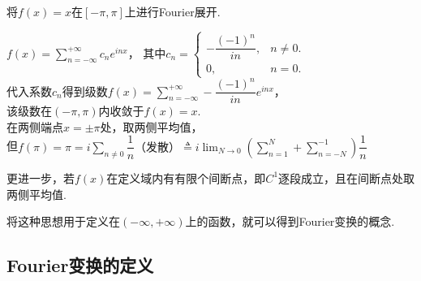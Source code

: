 \documentclass[openany,oneside]{ctexbook}
\begin{document}
\begin{example}
    将$f(x)=x$在$[-\pi,\pi]$上进行Fourier展开.
\end{example}
\begin{solution}
    $f(x)=\displaystyle\sum_{n=-\infty}^{+\infty}c_ne^{inx}$，
    其中$c_n=
        \begin{cases}
            -\dfrac{(-1)^n}{in}, & n\neq0.\\
            0, & n=0.
        \end{cases}
    $\\
    代入系数$c_n$得到级数$f(x)=\displaystyle\sum_{n=-\infty}^{+\infty}-\dfrac{(-1)^n}{in}e^{inx}$，\\
    该级数在$(-\pi,\pi)$内收敛于$f(x)=x$.\\
    在两侧端点$x=\pm\pi$处，取两侧平均值，\\
    但$f(\pi)=\pi=i\displaystyle\sum_{n\neq0}\dfrac{1}{n}\text{（发散）}\triangleq i\lim_{N\to0}(\displaystyle\sum_{n=1}^N+\displaystyle\sum_{n=-N}^{-1})\dfrac{1}{n}$
\end{solution}
更进一步，若$f(x)$在定义域内有有限个间断点，即$C^1$逐段成立，且在间断点处取两侧平均值.\\
\par 将这种思想用于定义在$(-\infty,+\infty)$上的函数，就可以得到Fourier变换的概念.



\subsection{Fourier变换的定义}
\end{document}
